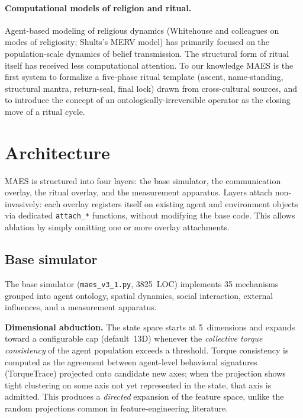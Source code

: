 \documentclass[11pt,a4paper]{article}
\begin{document}
\paragraph{Computational models of religion and ritual.}
Agent-based modeling of religious dynamics (Whitehouse and colleagues
on modes of religiosity; Shults's MERV model) has primarily focused on
the population-scale dynamics of belief transmission. The structural form
of ritual itself has received less computational attention. To our
knowledge MAES is the first system to formalize a five-phase ritual
template (ascent, name-standing, structural mantra, return-seal, final
lock) drawn from cross-cultural sources, and to introduce the concept of
an ontologically-irreversible operator as the closing move of a ritual
cycle.

\section{Architecture}
\label{sec:arch}

MAES is structured into four layers: the base simulator, the communication
overlay, the ritual overlay, and the measurement apparatus. Layers attach
non-invasively: each overlay registers itself on existing agent and
environment objects via dedicated \texttt{attach\_*} functions, without
modifying the base code. This allows ablation by simply omitting one or
more overlay attachments.

\subsection{Base simulator}

The base simulator (\texttt{maes\_v3\_1.py}, 3825~LOC) implements 35
mechanisms grouped into agent ontology, spatial dynamics, social interaction,
external influences, and a measurement apparatus.

\textbf{Dimensional abduction.} The state space starts at 5~dimensions
and expands toward a configurable cap (default~13D) whenever the
\emph{collective torque consistency} of the agent population exceeds a
threshold. Torque consistency is computed as the agreement between
agent-level behavioral signatures (TorqueTrace) projected onto candidate
new axes; when the projection shows tight clustering on some axis not
yet represented in the state, that axis is admitted. This produces a
\emph{directed} expansion of the feature space, unlike the random
projections common in feature-engineering literature.
\end{document}
